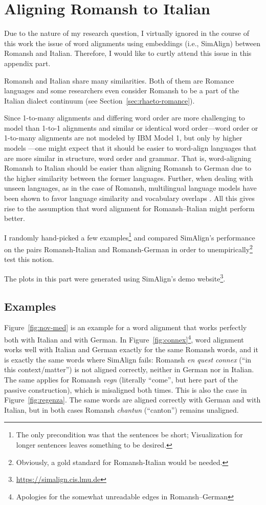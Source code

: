 \chapter{Aligning Romansh to Italian}\label{app:rm-it}

Due to the nature of my research question, I virtually ignored in the course of this work the issue of word alignments using embeddings (i.e., SimAlign) between Romansh and Italian. 
Therefore, I would like to curtly attend this issue in this appendix part.

Romansh and Italian share many similarities. 
Both of them are Romance languages and some researchers even consider Romansh to be a part of the Italian dialect continuum (see Section~\ref{sec:rhaeto-romance}). 

Since 1-to-many alignments and differing word order are more challenging to model than 1-to-1 alignments and similar or identical word order---word order or 1-to-many alignments are not modeled by IBM Model 1, but only by higher models \autocite{brown-etal-1993-mathematics}---one might expect that it should be easier to word-align languages that are more similar in structure, word order and grammar. 
That is, word-aligning Romansh to Italian should be easier than aligning Romansh to German due to the higher similarity between the former languages.
Further, when dealing with unseen languages, as in the case of Romansh, multilingual language models have been shown to favor language similarity and vocabulary overlaps \autocite{pires-etal-2019-multilingual}. 
All this gives rise to the assumption that word alignment for Romansh--Italian might perform better.

I randomly hand-picked a few examples\footnote{The only precondition was that the sentences be short; Visualization for longer sentences leaves something to be desired.} and compared SimAlign's performance on the pairs Romansh-Italian and Romansh-German in order to unempirically\footnote{Obviously, a gold standard for Romansh-Italian would be needed.} test this notion.

The plots in this part were generated using SimAlign's demo website\footnote{\url{https://simalign.cis.lmu.de}}.

\section{Examples}
Figure~\ref{fig:nov-med} is an example for a word alignment that works perfectly both with Italian and with German. 
In Figure~\ref{fig:connex}\footnote{Apologies for the somewhat unreadable edges in Romansh--German}, word alignment works well with Italian and German exactly for the same Romansh words, and it is exactly the same words where SimAlign fails: 
Romansh \emph{en quest connex} (\enquote{in this context/matter}) is not aligned correctly, neither in German nor in Italian. 
The same applies for Romansh \emph{vegn} (literally \enquote{come}, but here part of the passive construction), which is misaligned both times.
This is also the case in Figure~\ref{fig:regenza}. 
The same words are aligned correctly with German and with Italian, 
but in both cases Romansh \emph{chantun} (\enquote{canton}) remains unaligned.


